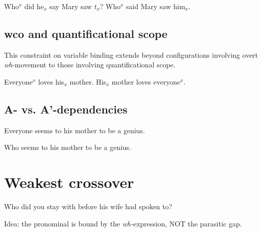 \documentclass[nols,twoside,nofonts,nobib,nohyper]{tufte-handout}
\begin{document}
\pex
\a\ljudge{*}Who$^{x}$ did he$_{x}$ say Mary saw $t_{x}$?
\a Who$^{x}$ said Mary saw him$_{x}$.
\xe

\subsection{\ac{wco} and quantificational scope}

This constraint on variable binding
extends beyond configurations involving overt \textit{wh}-movement to those
involving quantificational scope.

\pex
\a Everyone$^{x}$ loves his$_{x}$ mother.
\a\ljudge{*}His$_{x}$ mother loves everyone$^{x}$.
\xe

\subsection{A- vs. A'-dependencies}

\ex
Everyone seems to his mother to be a genius.
\xe

\ex
Who seems to his mother to be a genius.
\xe

\section{Weakest crossover}


\ex
Who did you stay with before his wife had spoken to?
\xe

Idea: the pronominal is bound by the \textit{wh-}expression, NOT the parasitic gap.

\printbibliography
\end{document}
